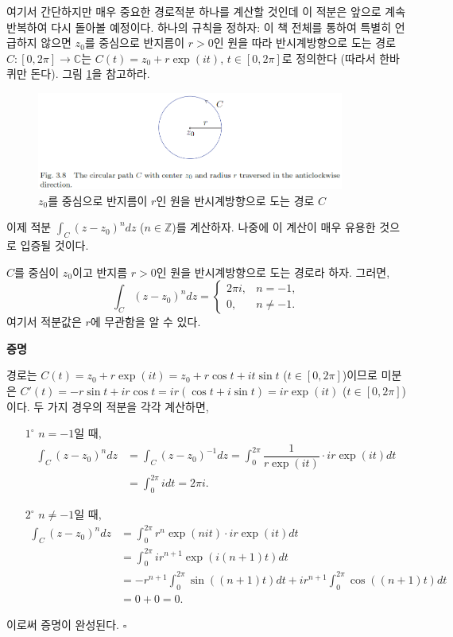 여기서 간단하지만 매우 중요한 경로적분 하나를 계산할 것인데
이 적분은 앞으로 계속 반복하여 다시 돌아볼 예정이다.
하나의 규칙을 정하자: 이 책 전체를 통하여 특별히 언급하지 않으면
$z_0$를 중심으로 반지름이 $r>0$인 원을 따라 반시계방향으로 도는 경로
$C: [0, 2\pi] \to \mathbb C$는 $C(t) = z_0 + r\exp(it)$, $t\in[0,2\pi]$로 정의한다
(따라서 한바퀴만 돈다). 그림 \ref{fig-3-8}을 참고하라.
\begin{figure}[!h]
\begin{center}
\includegraphics[width=0.9\textwidth]{./SaltChapter/fig-3-8}
\end{center}
\caption{$z_0$를 중심으로 반지름이 $r$인 원을 반시계방향으로 도는 경로 $C$}
\label{fig-3-8}
\end{figure}

이제 적분 $\int_C (z-z_0)^n dz$ ($n\in\mathbb Z$)를 계산하자.
나중에 이 계산이 매우 유용한 것으로 입증될 것이다.

\begin{salt_theorem} \label{thm-3-1}
$C$를 중심이 $z_0$이고 반지름 $r>0$인 원을 반시계방향으로 도는 경로라 하자.
그러면,
\[
\int_C (z-z_0)^n dz = \begin{cases}
2\pi i, & n=-1,\\
0, & n\ne -1.
\end{cases}
\]
여기서 적분값은 $r$에 무관함을 알 수 있다.
\end{salt_theorem}

{\bf 증명}

경로는 $C(t) = z_0 + r\exp(it) = z_0 + r\cos t + it\sin t$ ($t\in[0,2\pi]$)이므로
미분은 $C'(t) = -r\sin t + ir\cos t = ir(\cos t + i\sin t) = ir\exp(it)$ ($t\in[0,2\pi]$)이다.
두 가지 경우의 적분을 각각 계산하면,

\begin{itemize}
\item[$1^\circ$] $n=-1$일 때,
\begin{align*}
\int_C (z-z_0)^n dz
&= \int_C (z-z_0)^{-1} dz = \int_0^{2\pi} \dfrac1{r\exp(it)}\cdot ir \exp(it)dt \\
&= \int_0^{2\pi} i dt  = 2\pi i.
\end{align*}
\item[$2^\circ$] $n\ne -1$일 때,
\begin{align*}
\int_C (z-z_0)^n dz
&= \int_0^{2\pi} r^n \exp(nit) \cdot ir \exp(it)dt \\
&= \int_0^{2\pi} ir^{n+1} \exp(i(n+1)t)dt \\
&= -r^{n+1} \int_0^{2\pi} \sin((n+1)t)dt + 
ir^{n+1} \int_0^{2\pi} \cos((n+1)t)dt \\
&= 0+0 = 0.
\end{align*}
\end{itemize}
이로써 증명이 완성된다.
\hfill $\square$

